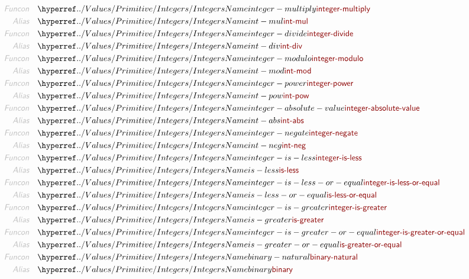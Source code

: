 \begin{align*}
  \KEY{Funcon} \quad & \NAMEHYPER{../Values/Primitive}{Integers}{integer-multiply} \\
  \KEY{Alias} \quad & \NAMEHYPER{../Values/Primitive}{Integers}{int-mul} \\
  \KEY{Funcon} \quad & \NAMEHYPER{../Values/Primitive}{Integers}{integer-divide} \\
  \KEY{Alias} \quad & \NAMEHYPER{../Values/Primitive}{Integers}{int-div} \\
  \KEY{Funcon} \quad & \NAMEHYPER{../Values/Primitive}{Integers}{integer-modulo} \\
  \KEY{Alias} \quad & \NAMEHYPER{../Values/Primitive}{Integers}{int-mod} \\
  \KEY{Funcon} \quad & \NAMEHYPER{../Values/Primitive}{Integers}{integer-power} \\
  \KEY{Alias} \quad & \NAMEHYPER{../Values/Primitive}{Integers}{int-pow} \\
  \KEY{Funcon} \quad & \NAMEHYPER{../Values/Primitive}{Integers}{integer-absolute-value} \\
  \KEY{Alias} \quad & \NAMEHYPER{../Values/Primitive}{Integers}{int-abs} \\
  \KEY{Funcon} \quad & \NAMEHYPER{../Values/Primitive}{Integers}{integer-negate} \\
  \KEY{Alias} \quad & \NAMEHYPER{../Values/Primitive}{Integers}{int-neg} \\
  \KEY{Funcon} \quad & \NAMEHYPER{../Values/Primitive}{Integers}{integer-is-less} \\
  \KEY{Alias} \quad & \NAMEHYPER{../Values/Primitive}{Integers}{is-less} \\
  \KEY{Funcon} \quad & \NAMEHYPER{../Values/Primitive}{Integers}{integer-is-less-or-equal} \\
  \KEY{Alias} \quad & \NAMEHYPER{../Values/Primitive}{Integers}{is-less-or-equal} \\
  \KEY{Funcon} \quad & \NAMEHYPER{../Values/Primitive}{Integers}{integer-is-greater} \\
  \KEY{Alias} \quad & \NAMEHYPER{../Values/Primitive}{Integers}{is-greater} \\
  \KEY{Funcon} \quad & \NAMEHYPER{../Values/Primitive}{Integers}{integer-is-greater-or-equal} \\
  \KEY{Alias} \quad & \NAMEHYPER{../Values/Primitive}{Integers}{is-greater-or-equal} \\
  \KEY{Funcon} \quad & \NAMEHYPER{../Values/Primitive}{Integers}{binary-natural} \\
  \KEY{Alias} \quad & \NAMEHYPER{../Values/Primitive}{Integers}{binary} \\

\end{align*}
